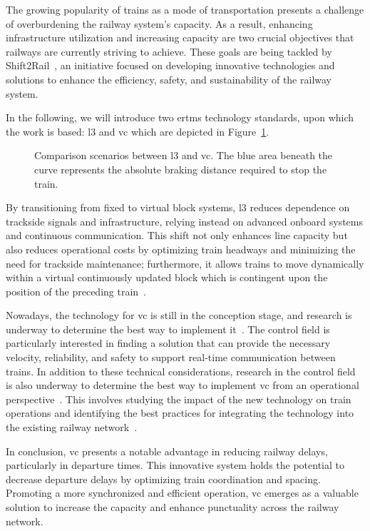 \documentclass[letterpaper, 10 pt, conference]{ieeeconf}
\theoremstyle{definition}
\theoremstyle{nopoint}
\begin{document}
The growing popularity of trains as a mode of transportation presents a challenge of overburdening the railway system's capacity. As a result, enhancing infrastructure utilization and increasing capacity are two crucial objectives that railways are currently striving to achieve. These goals are being tackled by Shift2Rail~\cite{shift2rail}, an initiative focused on developing innovative technologies and solutions to enhance the efficiency, safety, and sustainability of the railway system.



In the following, we will introduce two \gls{ertms} technology standards, upon which the work is based: \gls{l3} and \gls{vc} which are depicted in Figure~\ref{fig:ertmsl3vc}.
 \begin{figure}[h]
	\resizebox{\linewidth}{!}{}
	\caption{Comparison scenarios between \gls{l3} and \gls{vc}.
		The blue area beneath the curve represents the absolute braking distance required to stop the train.}
	\label{fig:ertmsl3vc}
\end{figure} 

 By transitioning from fixed to virtual block systems, \gls{l3} reduces dependence on trackside signals and infrastructure, relying instead on advanced onboard systems and continuous  communication. This shift not only enhances line capacity but also reduces operational costs by optimizing train headways and minimizing the need for trackside maintenance; furthermore, it allows trains to move dynamically within a virtual continuously updated block which  is contingent upon the position of the preceding train~\cite{ertmsl3}.  
 



Nowadays, the technology for \gls{vc} is still in the conception stage, and research is underway to determine the best way to implement it~\cite{flamini2018}. The control field is particularly interested in finding a solution that can provide the necessary velocity, reliability, and safety to support real-time communication between trains. In addition to these technical considerations, research in the control field is also underway to determine the best way to implement \gls{vc} from an operational perspective~\cite{dimeo2020}. This involves studying the impact of the new technology on train operations and identifying the best practices for integrating the technology into the existing railway network~\cite{ertmsl4}.


 In conclusion, \gls{vc} presents a notable advantage in reducing railway delays, particularly in departure times. This innovative system holds the potential to decrease departure delays by optimizing train coordination and spacing. Promoting a more synchronized and efficient operation, \gls{vc} emerges as a valuable solution to increase the capacity and enhance punctuality across the railway network.
%
\end{document}
